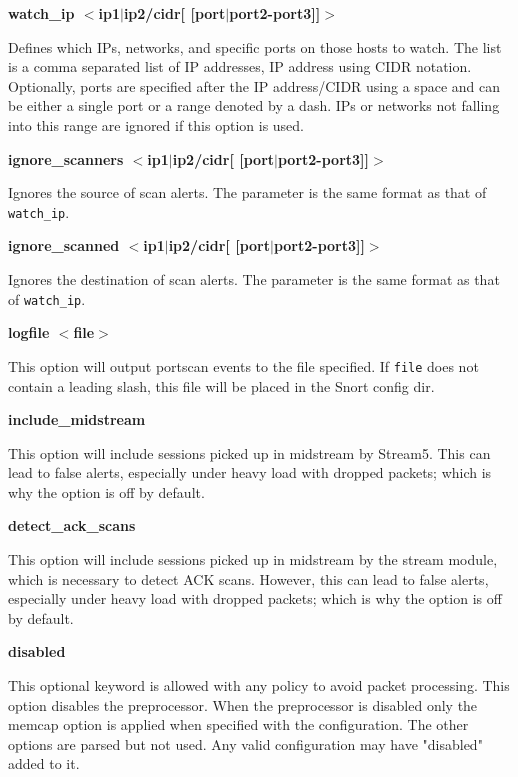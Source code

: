 \documentclass[english]{report}
\newcounter{slistnum}
\newenvironment{slist}
{ \begin{list}{ {\bf \arabic{slistnum}.} }{\usecounter{slistnum} } }
{ \end{list} }
\begin{document}
\begin{slist}
\begin{itemize}
\end{itemize}

\item \textbf{watch\_ip $<$ip1$|$ip2/cidr[ [port$|$port2-port3]]$>$ }

Defines which IPs, networks, and specific ports on those hosts to watch.  The
list is a comma separated list of IP addresses, IP address using CIDR notation.
Optionally, ports are specified after the IP address/CIDR using a space and can
be either a single port or a range denoted by a dash.  IPs or networks not
falling into this range are ignored if this option is used.

\item \textbf{ignore\_scanners $<$ip1$|$ip2/cidr[ [port$|$port2-port3]]$>$ }

Ignores the source of scan alerts.  The parameter is the same format as that of
\texttt{watch\_ip}.

\item \textbf{ignore\_scanned $<$ip1$|$ip2/cidr[ [port$|$port2-port3]]$>$ }

Ignores the destination of scan alerts.  The parameter is the same format as
that of \texttt{watch\_ip}.

\item \textbf{logfile $<$file$>$ } 

This option will output portscan events to the file specified. If \texttt{file}
does not contain a leading slash, this file will be placed in the Snort config
dir.

\item \textbf{include\_midstream}

This option will include sessions picked up in midstream by Stream5.
This can lead to false alerts, especially under heavy load with dropped
packets; which is why the option is off by default.

\item \textbf{detect\_ack\_scans}

This option will include sessions picked up in midstream by the stream module,
which is necessary to detect ACK scans.  However, this can lead to false
alerts, especially under heavy load with dropped packets; which is why the
option is off by default.

\item \textbf{disabled}

This optional keyword is allowed with any policy to avoid packet processing.
This option disables the preprocessor. When the preprocessor is disabled
only the memcap option is applied when specified with the configuration.
The other options are parsed but not used. Any valid configuration may have
"disabled" added to it.

\end{slist}
\end{document}
